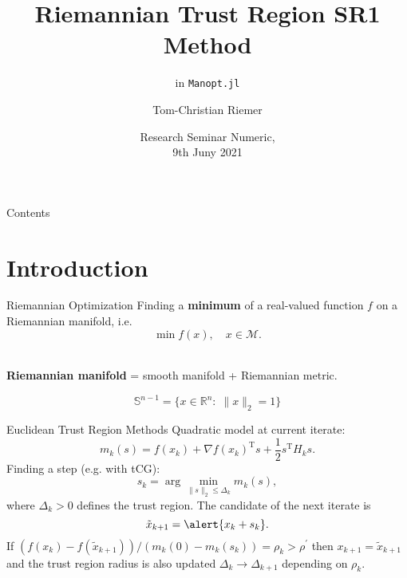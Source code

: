 \documentclass{beamer}
\title{Riemannian Trust Region SR1 Method}
\subtitle{in \lstinline!Manopt.jl!}
\author{Tom-Christian Riemer}
\institute{TU Chemnitz}
\date{Research Seminar Numeric,\\ 9th Juny 2021}
\begin{document}
\maketitle

\begin{frame}{Contents}
	\tableofcontents
\end{frame}

\section{Introduction}

\begin{frame}{Riemannian Optimization}
    Finding a \textbf{minimum} of a real-valued function $f$ on a Riemannian manifold, i.e.
    \begin{equation*}
        \min f(x), \quad x \in \mathcal{M}.
    \end{equation*}\\[1.\baselineskip]
    \begin{center}
        \textbf{Riemannian manifold} = smooth manifold + Riemannian metric. \\[1.\baselineskip]
    \end{center}
    \begin{equation*}
        \mathbb{S}^{n-1} = \{ x \in \mathbb{R}^n \colon \; \lVert x \rVert_2 = 1 \}
    \end{equation*}
\end{frame}

\begin{frame}{Euclidean Trust Region Methods}
    \alert{Quadratic model} at current iterate:
	\begin{equation*}
    	m_k(s) = f(x_k) + {\nabla f(x_k)}^{\mathrm{T}} s + \frac{1}{2} s^{\mathrm{T}} H_k s.
    \end{equation*}
	Finding a \alert{step} (e.g. with tCG):
	\begin{equation*}
        s_k = \arg \min_{\lVert s \rVert_2 \leq \Delta_k} m_k(s),
    \end{equation*}
	where $\Delta_k > 0$ defines the \alert{trust region}. The candidate of the next iterate is
	\begin{equation*}
        \tilde{x}_{k+1} = \alert{x_k + s_k}.
    \end{equation*}
	If $(f(x_k) - f(\tilde{x}_{k+1}))/(m_k(0) - m_k(s_k)) = \rho_k > \rho^{\prime}$ then $x_{k+1} = \tilde{x}_{k+1}$ and the trust region radius is also updated $\Delta_k \rightarrow \Delta_{k+1}$ depending on $\rho_k$.  
\end{frame}
\end{document}
